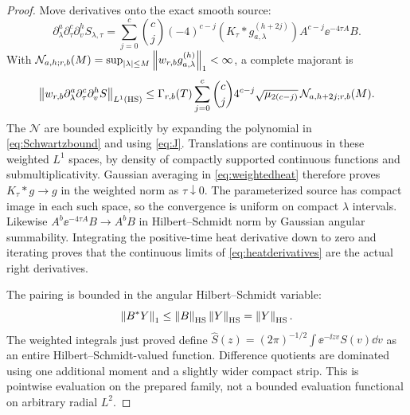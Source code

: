 \begin{proof}
Move derivatives onto the exact smooth source:
\begin{equation}\label{eq:heatderivatives}
 \partial_\lambda^a\partial_\tau^c\partial_v^hS_{\lambda,\tau}
 =\sum_{j=0}^c\binom cj(-4)^{c-j}
 (K_\tau*g_{a,\lambda}^{(h+2j)})
 A^{c-j}\ee^{-4\tau A}B.
\end{equation}
With
$\mathcal N_{a,h;r,b}(M)=\sup_{|\lambda|\le M}
\left\lVert w_{r,b}g_{a,\lambda}^{(h)}\right\rVert_1<\infty$, a complete majorant is
\begin{equation}\label{eq:heatmajorant}
 \left\lVert w_{r,b}\partial_\lambda^a\partial_\tau^c\partial_v^hS\right\rVert_{L^1(\operatorname{HS})}
 \le\Gamma_{r,b}(T)\sum_{j=0}^c\binom cj4^{c-j}
 \sqrt{\mu_{2(c-j)}}\,\mathcal N_{a,h+2j;r,b}(M).
\end{equation}
The $\mathcal N$ are bounded explicitly by expanding the polynomial
in \eqref{eq:Schwartzbound} and using \eqref{eq:J}.
Translations are continuous in these weighted $L^1$ spaces, by density
of compactly supported continuous functions and submultiplicativity.
Gaussian averaging in \eqref{eq:weightedheat} therefore proves
$K_\tau*g\to g$ in the weighted norm as $\tau\downarrow0$.
The parameterized source has compact image in each such space, so the
convergence is uniform on compact $\lambda$ intervals.
Likewise $A^b\ee^{-4\tau A}B\to A^bB$ in Hilbert--Schmidt norm by
Gaussian angular summability. Integrating the positive-time heat
derivative down to zero and iterating proves that the continuous limits
of \eqref{eq:heatderivatives} are the actual right derivatives.

The pairing is bounded in the angular Hilbert--Schmidt variable:
\begin{equation}\label{eq:HSpair}
 \left\lVert B^*Y\right\rVert_1\le\left\lVert B\right\rVert_{\operatorname{HS}}\left\lVert Y\right\rVert_{\operatorname{HS}}=\left\lVert Y\right\rVert_{\operatorname{HS}}.
\end{equation}
The weighted integrals just proved define
$\widehat S(z)=(2\pi)^{-1/2}\int\ee^{-\ii zv}S(v)\dd v$
as an entire Hilbert--Schmidt-valued function. Difference quotients are
dominated using one additional moment and a slightly wider compact
strip. This is pointwise evaluation on the prepared family, not a
bounded evaluation functional on arbitrary radial $L^2$.


\end{proof}
